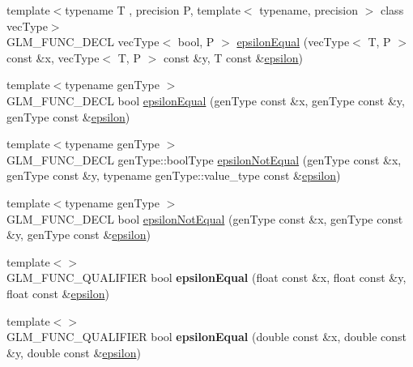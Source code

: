 \begin{DoxyCompactItemize}
\item 
{\footnotesize template$<$typename T , precision P, template$<$ typename, precision $>$ class vec\-Type$>$ }\\G\-L\-M\-\_\-\-F\-U\-N\-C\-\_\-\-D\-E\-C\-L vec\-Type$<$ bool, P $>$ \hyperlink{group__gtc__epsilon_gaca9443f217dc36587624247245522331}{epsilon\-Equal} (vec\-Type$<$ T, P $>$ const \&x, vec\-Type$<$ T, P $>$ const \&y, T const \&\hyperlink{group__gtc__constants_gacb41049b8d22c8aa90e362b96c524feb}{epsilon})
\item 
{\footnotesize template$<$typename gen\-Type $>$ }\\G\-L\-M\-\_\-\-F\-U\-N\-C\-\_\-\-D\-E\-C\-L bool \hyperlink{group__gtc__epsilon_gaa7f227999ca09e7ca994e8b35aba47bb}{epsilon\-Equal} (gen\-Type const \&x, gen\-Type const \&y, gen\-Type const \&\hyperlink{group__gtc__constants_gacb41049b8d22c8aa90e362b96c524feb}{epsilon})
\item 
{\footnotesize template$<$typename gen\-Type $>$ }\\G\-L\-M\-\_\-\-F\-U\-N\-C\-\_\-\-D\-E\-C\-L gen\-Type\-::bool\-Type \hyperlink{group__gtc__epsilon_ga14e2888a304654ade8a3996024e2739c}{epsilon\-Not\-Equal} (gen\-Type const \&x, gen\-Type const \&y, typename gen\-Type\-::value\-\_\-type const \&\hyperlink{group__gtc__constants_gacb41049b8d22c8aa90e362b96c524feb}{epsilon})
\item 
{\footnotesize template$<$typename gen\-Type $>$ }\\G\-L\-M\-\_\-\-F\-U\-N\-C\-\_\-\-D\-E\-C\-L bool \hyperlink{group__gtc__epsilon_ga50a92103fb0cbd796908e1bf20c79aaf}{epsilon\-Not\-Equal} (gen\-Type const \&x, gen\-Type const \&y, gen\-Type const \&\hyperlink{group__gtc__constants_gacb41049b8d22c8aa90e362b96c524feb}{epsilon})
\item 
\hypertarget{namespaceglm_aded5e7ea9a0eacd03367ad77986c2a15}{{\footnotesize template$<$$>$ }\\G\-L\-M\-\_\-\-F\-U\-N\-C\-\_\-\-Q\-U\-A\-L\-I\-F\-I\-E\-R bool {\bfseries epsilon\-Equal} (float const \&x, float const \&y, float const \&\hyperlink{group__gtc__constants_gacb41049b8d22c8aa90e362b96c524feb}{epsilon})}\label{namespaceglm_aded5e7ea9a0eacd03367ad77986c2a15}

\item 
\hypertarget{namespaceglm_a6e30ea38a0e3ebc25d87e667255057e5}{{\footnotesize template$<$$>$ }\\G\-L\-M\-\_\-\-F\-U\-N\-C\-\_\-\-Q\-U\-A\-L\-I\-F\-I\-E\-R bool {\bfseries epsilon\-Equal} (double const \&x, double const \&y, double const \&\hyperlink{group__gtc__constants_gacb41049b8d22c8aa90e362b96c524feb}{epsilon})}\label{namespaceglm_a6e30ea38a0e3ebc25d87e667255057e5}


\end{DoxyCompactItemize}
